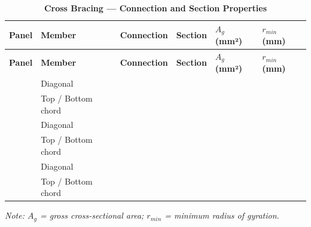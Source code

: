 \documentclass[12pt,a4paper]{report}
\newcommand{\ReportCompactTable}{\setlength{\tabcolsep}{3.5pt}}
\newcommand{\ReportLeftAlignedLongTable}{\setlength{\LTleft}{0pt}\setlength{\LTright}{\fill}}
\numberwithin{table}{chapter}
\numberwithin{figure}{chapter}
\begin{document}
\vspace{1em}

\vspace{0.4em}
\noindent
\ReportCompactTable
\ReportLeftAlignedLongTable

\begin{longtable}{|C{2.0cm}|L{2.0cm}|L{2.2cm}|C{2.5cm}|C{2.0cm}|C{2.0cm}|}
\caption{\textbf{Cross Bracing --- Connection and Section Properties}}
\hline
\textbf{Panel} & \textbf{Member} & \textbf{Connection} & \textbf{Section} & \textbf{$A_g$ (mm²)} & \textbf{$r_{min}$ (mm)} \\[6pt]
\hline
\endfirsthead
\textbf{Panel} & \textbf{Member} & \textbf{Connection} & \textbf{Section} & \textbf{$A_g$ (mm²)} & \textbf{$r_{min}$ (mm)} \\[6pt]
\hline
\endhead
{} & Diagonal &  &  &  &  \\[6pt]
 & Top / Bottom chord &  &  &  &  \\[6pt]
\hline
{} & Diagonal &  &  &  &  \\[6pt]
 & Top / Bottom chord &  &  &  &  \\[6pt]
\hline
{} & Diagonal &  &  &  &  \\[6pt]
 & Top / Bottom chord &  &  &  &  \\[6pt]
\hline
\end{longtable}
\noindent\textit{Note: $A_g$ = gross cross-sectional area; $r_{min}$ = minimum radius of gyration.}
\end{document}
